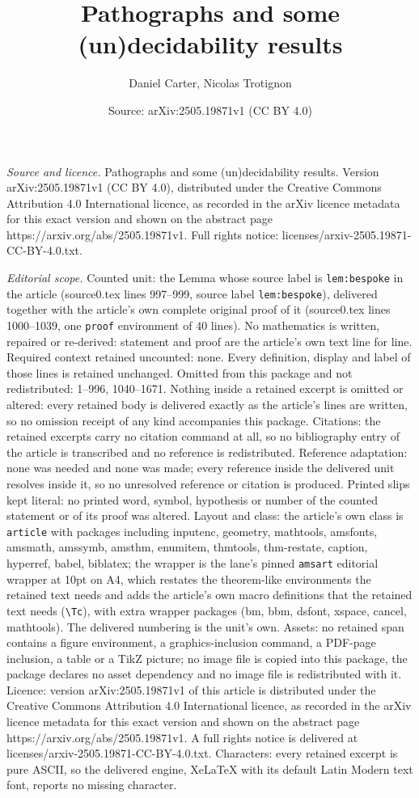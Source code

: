 \documentclass[10pt,a4paper]{amsart}
\title[Pathographs and some (un)decidability results]{Pathographs and some (un)decidability results}
\author{Daniel Carter, Nicolas Trotignon}
\date{Source: arXiv:2505.19871v1 (CC BY 4.0)}
\begin{document}
\maketitle

\noindent\emph{Source and licence.} Pathographs and some (un)decidability results. Version arXiv:2505.19871v1 (CC BY 4.0), distributed under the Creative Commons Attribution 4.0 International licence, as recorded in the arXiv licence metadata for this exact version and shown on the abstract page https://arxiv.org/abs/2505.19871v1. Full rights notice: licenses/arxiv-2505.19871-CC-BY-4.0.txt.\par\smallskip

\noindent\textit{Editorial scope.} Counted unit: the Lemma whose source label is \texttt{lem:bespoke} in the article (source0.tex lines 997--999, source label \texttt{lem:bespoke}), delivered together with the article's own complete original proof of it (source0.tex lines 1000--1039, one \texttt{proof} environment of 40 lines). No mathematics is written, repaired or re-derived: statement and proof are the article's own text line for line. Required context retained uncounted: none. Every definition, display and label of those lines is retained unchanged. Omitted from this package and not redistributed: 1--996, 1040--1671. Nothing inside a retained excerpt is omitted or altered: every retained body is delivered exactly as the article's lines are written, so no omission receipt of any kind accompanies this package. Citations: the retained excerpts carry no citation command at all, so no bibliography entry of the article is transcribed and no reference is redistributed. Reference adaptation: none was needed and none was made; every reference inside the delivered unit resolves inside it, so no unresolved reference or citation is produced. Printed slips kept literal: no printed word, symbol, hypothesis or number of the counted statement or of its proof was altered. Layout and class: the article's own class is \texttt{article} with packages including inputenc, geometry, mathtools, amsfonts, amsmath, amssymb, amsthm, enumitem, thmtools, thm-restate, caption, hyperref, babel, biblatex; the wrapper is the lane's pinned \texttt{amsart} editorial wrapper at 10pt on A4, which restates the theorem-like environments the retained text needs and adds the article's own macro definitions that the retained text needs (\texttt{\textbackslash Tc}), with extra wrapper packages (bm, bbm, dsfont, xspace, cancel, mathtools). The delivered numbering is the unit's own. Assets: no retained span contains a figure environment, a graphics-inclusion command, a PDF-page inclusion, a table or a TikZ picture; no image file is copied into this package, the package declares no asset dependency and no image file is redistributed with it. Licence: version arXiv:2505.19871v1 of this article is distributed under the Creative Commons Attribution 4.0 International licence, as recorded in the arXiv licence metadata for this exact version and shown on the abstract page https://arxiv.org/abs/2505.19871v1. A full rights notice is delivered at licenses/arxiv-2505.19871-CC-BY-4.0.txt. Characters: every retained excerpt is pure ASCII, so the delivered engine, XeLaTeX with its default Latin Modern text font, reports no missing character.
\end{document}
